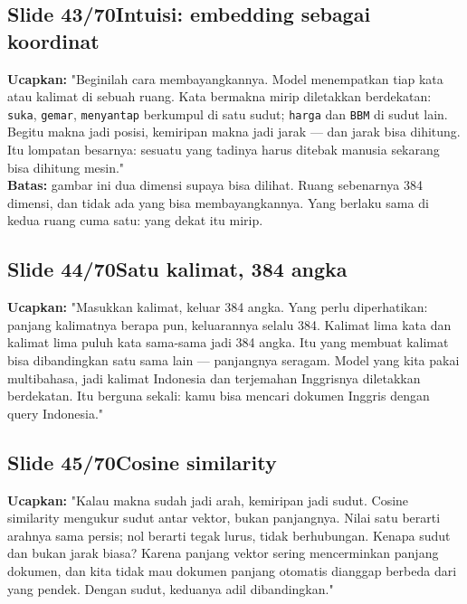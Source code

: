 \documentclass[11pt]{article}
\renewcommand{\framebox}[1]{\colorbox{acc!15}{\textcolor{acc}{\textbf{#1}}}}
\begin{document}
\subsection*{\framebox{Slide 43/70}\quad Intuisi: embedding sebagai koordinat}
\textbf{Ucapkan:} "Beginilah cara membayangkannya. Model menempatkan tiap kata atau kalimat di sebuah ruang. Kata bermakna mirip diletakkan berdekatan: \texttt{suka}, \texttt{gemar}, \texttt{menyantap} berkumpul di satu sudut; \texttt{harga} dan \texttt{BBM} di sudut lain. Begitu makna jadi posisi, kemiripan makna jadi jarak — dan jarak bisa dihitung. Itu lompatan besarnya: sesuatu yang tadinya harus ditebak manusia sekarang bisa dihitung mesin."\\[2pt]
\textbf{Batas:} gambar ini dua dimensi supaya bisa dilihat. Ruang sebenarnya 384 dimensi, dan tidak ada yang bisa membayangkannya. Yang berlaku sama di kedua ruang cuma satu: yang dekat itu mirip.\\[2pt]

\subsection*{\framebox{Slide 44/70}\quad Satu kalimat, 384 angka}
\textbf{Ucapkan:} "Masukkan kalimat, keluar 384 angka. Yang perlu diperhatikan: panjang kalimatnya berapa pun, keluarannya selalu 384. Kalimat lima kata dan kalimat lima puluh kata sama-sama jadi 384 angka. Itu yang membuat kalimat bisa dibandingkan satu sama lain — panjangnya seragam. Model yang kita pakai multibahasa, jadi kalimat Indonesia dan terjemahan Inggrisnya diletakkan berdekatan. Itu berguna sekali: kamu bisa mencari dokumen Inggris dengan query Indonesia."\\[2pt]

\subsection*{\framebox{Slide 45/70}\quad Cosine similarity}
\textbf{Ucapkan:} "Kalau makna sudah jadi arah, kemiripan jadi sudut. Cosine similarity mengukur sudut antar vektor, bukan panjangnya. Nilai satu berarti arahnya sama persis; nol berarti tegak lurus, tidak berhubungan. Kenapa sudut dan bukan jarak biasa? Karena panjang vektor sering mencerminkan panjang dokumen, dan kita tidak mau dokumen panjang otomatis dianggap berbeda dari yang pendek. Dengan sudut, keduanya adil dibandingkan."\\[2pt]
\end{document}
